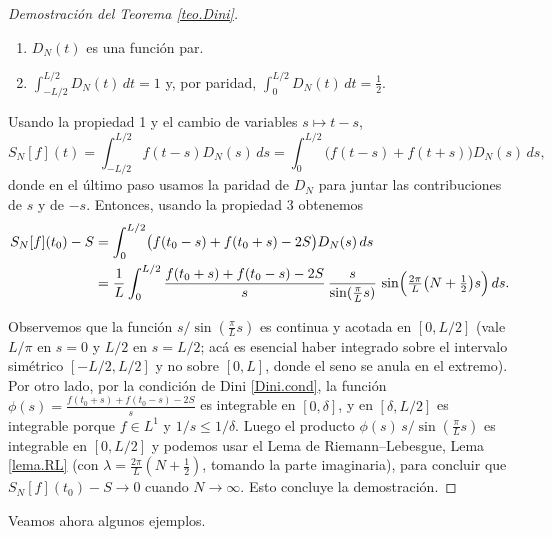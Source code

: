 \documentclass[12pt, a4paper]{amsbook}
\theoremstyle{remark}
\theoremstyle{definition}
\numberwithin{section}{chapter}
\numberwithin{subsection}{section}
\numberwithin{equation}{section}
\numberwithin{figure}{chapter}
\begin{document}
\begin{proof}[Demostración del Teorema \ref{teo.Dini}]
\begin{enumerate}
\item $D_N(t)$ es una función par.

\item $\int_{-L/2}^{L/2} D_N(t)\, dt = 1$ y, por paridad, $\int_{0}^{L/2} D_N(t)\, dt = \frac12$.
\end{enumerate}

Usando la propiedad 1 y el cambio de variables $s\mapsto t-s$,
$$
S_N[f](t) = \int_{-L/2}^{L/2} f(t-s)D_N(s)\, ds = \int_{0}^{L/2} \bigl(f(t-s)+f(t+s)\bigr)D_N(s)\, ds,
$$
donde en el último paso usamos la paridad de $D_N$ para juntar las contribuciones de $s$ y de $-s$. Entonces, usando la propiedad 3 obtenemos
\begin{align*}
S_N[f](t_0) - S &= \int_0^{L/2} \bigl(f(t_0-s) + f(t_0+s) - 2S\bigr) D_N(s)\, ds\\
& = \frac{1}{L} \int_0^{L/2} \frac{f(t_0+s)+f(t_0-s) - 2S}{s}\, \frac{s}{\sin(\frac{\pi}{L}s)}\,\sin\Bigl(\tfrac{2\pi}{L}\bigl(N+\tfrac12\bigr)s\Bigr)\, ds.
\end{align*}

Observemos que la función $s/\sin(\frac{\pi}{L}s)$ es continua y acotada en $[0,L/2]$ (vale $L/\pi$ en $s=0$ y $L/2$ en $s=L/2$; acá es esencial haber integrado sobre el intervalo simétrico $[-L/2,L/2]$ y no sobre $[0,L]$, donde el seno se anula en el extremo). Por otro lado, por la condición de Dini \eqref{Dini.cond}, la función $\phi(s) = \frac{f(t_0+s)+f(t_0-s) - 2S}{s}$ es integrable en $[0,\delta]$, y en $[\delta,L/2]$ es integrable porque $f\in L^1$ y $1/s\le 1/\delta$. Luego el producto $\phi(s)\, s/\sin(\frac{\pi}{L}s)$ es integrable en $[0,L/2]$ y podemos usar el Lema de Riemann--Lebesgue, Lema \ref{lema.RL} (con $\lambda = \frac{2\pi}{L}(N+\frac12)$, tomando la parte imaginaria), para concluir que $S_N[f](t_0) - S\to 0$ cuando $N\to\infty$. Esto concluye la demostración.
\end{proof}


Veamos ahora algunos ejemplos.
\end{document}
